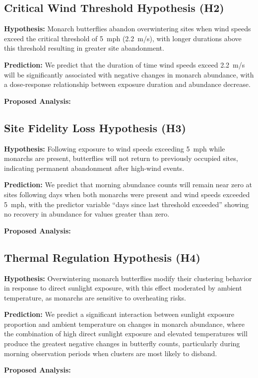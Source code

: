 \subsection{Critical Wind Threshold Hypothesis (H2)}

\textbf{Hypothesis:} Monarch butterflies abandon overwintering sites when wind speeds exceed the critical threshold of 5~mph (2.2~m/s), with longer durations above this threshold resulting in greater site abandonment.

\textbf{Prediction:} We predict that the duration of time wind speeds exceed 2.2~m/s will be significantly associated with negative changes in monarch abundance, with a dose-response relationship between exposure duration and abundance decrease.

\textbf{Proposed Analysis:}

\subsection{Site Fidelity Loss Hypothesis (H3)}

\textbf{Hypothesis:} Following exposure to wind speeds exceeding 5~mph while monarchs are present, butterflies will not return to previously occupied sites, indicating permanent abandonment after high-wind events.

\textbf{Prediction:} We predict that morning abundance counts will remain near zero at sites following days when both monarchs were present and wind speeds exceeded 5~mph, with the predictor variable ``days since last threshold exceeded'' showing no recovery in abundance for values greater than zero.

\textbf{Proposed Analysis:}

\subsection{Thermal Regulation Hypothesis (H4)}

\textbf{Hypothesis:} Overwintering monarch butterflies modify their clustering behavior in response to direct sunlight exposure, with this effect moderated by ambient temperature, as monarchs are sensitive to overheating risks.

\textbf{Prediction:} We predict a significant interaction between sunlight exposure proportion and ambient temperature on changes in monarch abundance, where the combination of high direct sunlight exposure and elevated temperatures will produce the greatest negative changes in butterfly counts, particularly during morning observation periods when clusters are most likely to disband.

\textbf{Proposed Analysis:}

